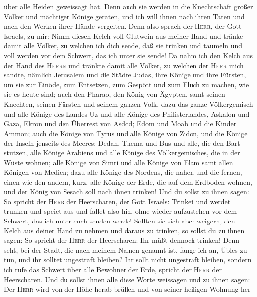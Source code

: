 über alle Heiden geweissagt hat.  Denn auch sie werden in
die Knechtschaft großer Völker und mächtiger Könige geraten, und ich
will ihnen nach ihren Taten und nach den Werken ihrer Hände vergelten.
 Denn also sprach der \textsc{Herr}, der Gott Israels, zu
mir: Nimm diesen Kelch voll Glutwein aus meiner Hand und tränke damit
alle Völker, zu welchen ich dich sende,  daß sie trinken
und taumeln und voll werden vor dem Schwert, das ich unter sie sende!
 Da nahm ich den Kelch aus der Hand des \textsc{Herrn}
und tränkte damit alle Völker, zu welchen der \textsc{Herr} mich sandte,
 nämlich Jerusalem und die Städte Judas, ihre Könige und
ihre Fürsten, um sie zur Einöde, zum Entsetzen, zum Gespött und zum
Fluch zu machen, wie sie es heute sind;  auch den Pharao,
den König von Ägypten, samt seinen Knechten, seinen Fürsten und seinem
ganzen Volk,  dazu das ganze Völkergemisch und alle
Könige des Landes Uz und alle Könige des Philisterlandes, Askalon und
Gaza, Ekron und den Überrest von Asdod;  Edom und Moab
und die Kinder Ammon;  auch die Könige von Tyrus und alle
Könige von Zidon, und die Könige der Inseln jenseits des Meeres;
 Dedan, Thema und Bus und alle, die den Bart stutzen,
 alle Könige Arabiens und alle Könige des
Völkergemisches, die in der Wüste wohnen;  alle Könige
von Simri und alle Könige von Elam samt allen Königen von Medien;
 dazu alle Könige des Nordens, die nahen und die fernen,
einen wie den andern, kurz, alle Könige der Erde, die auf dem Erdboden
wohnen, und der König von Sesach soll nach ihnen trinken!
 Und du sollst zu ihnen sagen: So spricht der
\textsc{Herr} der Heerscharen, der Gott Israels: Trinket und werdet
trunken und speiet aus und fallet also hin, ohne wieder aufzustehen vor
dem Schwert, das ich unter euch senden werde!  Sollten
sie sich aber weigern, den Kelch aus deiner Hand zu nehmen und daraus zu
trinken, so sollst du zu ihnen sagen: So spricht der \textsc{Herr} der
Heerscharen: Ihr müßt dennoch trinken!  Denn seht, bei
der Stadt, die nach meinem Namen genannt ist, fange ich an, Übles zu
tun, und ihr solltet ungestraft bleiben? Ihr sollt nicht ungestraft
bleiben, sondern ich rufe das Schwert über alle Bewohner der Erde,
spricht der \textsc{Herr} der Heerscharen.  Und du sollst
ihnen alle diese Worte weissagen und zu ihnen sagen: Der \textsc{Herr}
wird von der Höhe herab brüllen und von seiner heiligen Wohnung her
